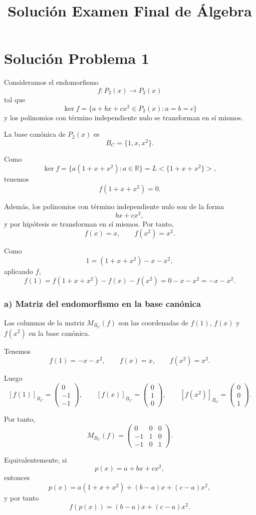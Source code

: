 \documentclass[12pt]{article}
\title{Solución Examen Final de Álgebra}
\author{}
\begin{document}
\section*{Solución Problema 1}

Consideramos el endomorfismo
\[
f:P_2(x)\longrightarrow P_2(x)
\]
tal que
\[
\ker f=\{a+bx+cx^2\in P_2(x):a=b=c\}
\]
y los polinomios con término independiente nulo se transforman en sí mismos.

La base canónica de \(P_2(x)\) es
\[
B_C=\{1,x,x^2\}.
\]

Como
\[
\ker f=\{a(1+x+x^2):a\in\mathbb{R}\}
=L<\{1+x+x^2\}>,
\]
tenemos
\[
f(1+x+x^2)=0.
\]

Además, los polinomios con término independiente nulo son de la forma
\[
bx+cx^2,
\]
y por hipótesis se transforman en sí mismos. Por tanto,
\[
f(x)=x,
\qquad
f(x^2)=x^2.
\]

Como
\[
1=(1+x+x^2)-x-x^2,
\]
aplicando \(f\),
\[
f(1)=f(1+x+x^2)-f(x)-f(x^2)=0-x-x^2=-x-x^2.
\]

\subsubsection*{a) Matriz del endomorfismo en la base canónica}

Las columnas de la matriz \(M_{B_C}(f)\) son las coordenadas de
\(f(1)\), \(f(x)\) y \(f(x^2)\) en la base canónica.

Tenemos
\[
f(1)=-x-x^2,
\qquad
f(x)=x,
\qquad
f(x^2)=x^2.
\]

Luego
\[
[f(1)]_{B_C}=
\begin{pmatrix}
0\\-1\\-1
\end{pmatrix},
\qquad
[f(x)]_{B_C}=
\begin{pmatrix}
0\\1\\0
\end{pmatrix},
\qquad
[f(x^2)]_{B_C}=
\begin{pmatrix}
0\\0\\1
\end{pmatrix}.
\]

Por tanto,
\[
\boxed{
M_{B_C}(f)=
\begin{pmatrix}
0&0&0\\
-1&1&0\\
-1&0&1
\end{pmatrix}.
}
\]

Equivalentemente, si
\[
p(x)=a+bx+cx^2,
\]
entonces
\[
p(x)=a(1+x+x^2)+(b-a)x+(c-a)x^2,
\]
y por tanto
\[
f(p(x))=(b-a)x+(c-a)x^2.
\]
\end{document}
